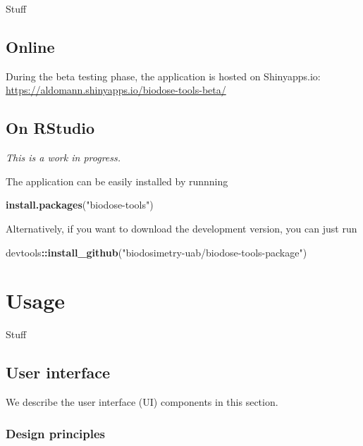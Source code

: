 \documentclass[]{scrartcl}
\newenvironment{Shaded}{\begin{snugshade}}{\end{snugshade}}
\newcommand{\KeywordTok}[1]{\textcolor[rgb]{0.13,0.29,0.53}{\textbf{#1}}}
\newcommand{\NormalTok}[1]{#1}
\newcommand{\OperatorTok}[1]{\textcolor[rgb]{0.81,0.36,0.00}{\textbf{#1}}}
\newcommand{\StringTok}[1]{\textcolor[rgb]{0.31,0.60,0.02}{#1}}
\begin{document}
Stuff

\hypertarget{get-online}{%
\subsection{Online}\label{get-online}}

During the beta testing phase, the application is hosted on Shinyapps.io: \url{https://aldomann.shinyapps.io/biodose-tools-beta/}

\hypertarget{get-offline}{%
\subsection{On RStudio}\label{get-offline}}

\emph{This is a work in progress.}

The application can be easily installed by runnning

\begin{Shaded}
\begin{Highlighting}[]
\KeywordTok{install.packages}\NormalTok{(}\StringTok{"biodose-tools"}\NormalTok{)}
\end{Highlighting}
\end{Shaded}

Alternatively, if you want to download the development version, you can just run

\begin{Shaded}
\begin{Highlighting}[]
\NormalTok{devtools}\OperatorTok{::}\KeywordTok{install_github}\NormalTok{(}\StringTok{"biodosimetry-uab/biodose-tools-package"}\NormalTok{)}
\end{Highlighting}
\end{Shaded}

\hypertarget{manual}{%
\section{Usage}\label{manual}}

Stuff

\hypertarget{manual-ui}{%
\subsection{User interface}\label{manual-ui}}

We describe the user interface (UI) components in this section.

\hypertarget{design-principles}{%
\subsubsection{Design principles}\label{design-principles}}
\end{document}
